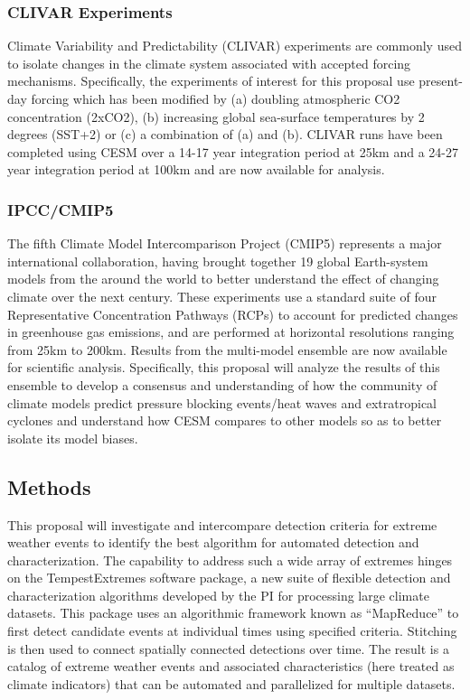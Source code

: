 \documentclass[11pt]{article}
\begin{document}
\subsubsection*{CLIVAR Experiments} \label{sec:CLIVAR}

Climate Variability and Predictability (CLIVAR) experiments are commonly used to isolate changes in the climate system associated with accepted forcing mechanisms.  Specifically, the experiments of interest for this proposal use present-day forcing which has been modified by (a) doubling atmospheric CO2 concentration (2xCO2), (b) increasing global sea-surface temperatures by 2 degrees (SST+2) or (c) a combination of (a) and (b).  CLIVAR runs have been completed using CESM over a 14-17 year integration period at 25km and a 24-27 year integration period at 100km and are now available for analysis.

\subsubsection*{IPCC/CMIP5} \label{sec:IPCC-CMIP5}

The fifth Climate Model Intercomparison Project (CMIP5) represents a major international collaboration, having brought together 19 global Earth-system models from the around the world to better understand the effect of changing climate over the next century.  These experiments use a standard suite of four Representative Concentration Pathways (RCPs) to account for predicted changes in greenhouse gas emissions, and are performed at horizontal resolutions ranging from 25km to 200km.  Results from the multi-model ensemble are now available for scientific analysis.  Specifically, this proposal will analyze the results of this ensemble to develop a consensus and understanding of how the community of climate models predict pressure blocking events/heat waves and extratropical cyclones and understand how CESM compares to other models so as to better isolate its model biases.

\subsection{Methods} \label{sec:Methods}

This proposal will investigate and intercompare detection criteria for extreme weather events to identify the best algorithm for automated detection and characterization.  The capability to address such a wide array of extremes hinges on the TempestExtremes software package, a new suite of flexible detection and characterization algorithms developed by the PI for processing large climate datasets. This package uses an algorithmic framework known as ``MapReduce'' to first detect candidate events at individual times using specified criteria. Stitching is then used to connect spatially connected detections over time. The result is a catalog of extreme weather events and associated characteristics (here treated as climate indicators) that can be automated and parallelized for multiple datasets.
\end{document}
